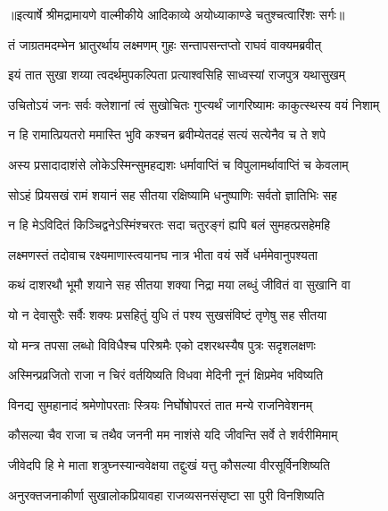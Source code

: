 {॥इत्यार्षे श्रीमद्रामायणे वाल्मीकीये आदिकाव्ये अयोध्याकाण्डे चतुश्चत्वारिंशः सर्गः॥}


\twolineshloka
{तं जाग्रतमदम्भेन भ्रातुरर्थाय लक्ष्मणम्}
{गुहः सन्तापसन्तप्तो राघवं वाक्यमब्रवीत्} %

\twolineshloka
{इयं तात सुखा शय्या त्वदर्थमुपकल्पिता}
{प्रत्याश्वसिहि साध्वस्यां राजपुत्र यथासुखम्} %

\twolineshloka
{उचितोऽयं जनः सर्वः क्लेशानां त्वं सुखोचितः}
{गुप्त्यर्थं जागरिष्यामः काकुत्स्थस्य वयं निशाम्} %

\twolineshloka
{न हि रामात्प्रियतरो ममास्ति भुवि कश्चन}
{ब्रवीम्येतदहं सत्यं सत्येनैव च ते शपे} %

\twolineshloka
{अस्य प्रसादादाशंसे लोकेऽस्मिन्सुमहद्यशः}
{धर्मावाप्तिं च विपुलामर्थावाप्तिं च केवलाम्} %

\twolineshloka
{सोऽहं प्रियसखं रामं शयानं सह सीतया}
{रक्षिष्यामि धनुष्पाणिः सर्वतो ज्ञातिभिः सह} %

\twolineshloka
{न हि मेऽविदितं किञ्चिद्वनेऽस्मिंश्चरतः सदा}
{चतुरङ्गं ह्यपि बलं सुमहत्प्रसहेमहि} %

\twolineshloka
{लक्ष्मणस्तं तदोवाच रक्ष्यमाणास्त्वयानघ}
{नात्र भीता वयं सर्वे धर्ममेवानुपश्यता} %

\twolineshloka
{कथं दाशरथौ भूमौ शयाने सह सीतया}
{शक्या निद्रा मया लब्धुं जीवितं वा सुखानि वा} %

\twolineshloka
{यो न देवासुरैः सर्वैः शक्यः प्रसहितुं युधि}
{तं पश्य सुखसंविष्टं तृणेषु सह सीतया} %

\twolineshloka
{यो मन्त्र तपसा लब्धो विविधैश्च परिश्रमैः}
{एको दशरथस्यैष पुत्रः सदृशलक्षणः} %

\twolineshloka
{अस्मिन्प्रव्रजितो राजा न चिरं वर्तयिष्यति}
{विधवा मेदिनी नूनं क्षिप्रमेव भविष्यति} %

\twolineshloka
{विनद्य सुमहानादं श्रमेणोपरताः स्त्रियः}
{निर्घोषोपरतं तात मन्ये राजनिवेशनम्} %

\twolineshloka
{कौसल्या चैव राजा च तथैव जननी मम}
{नाशंसे यदि जीवन्ति सर्वे ते शर्वरीमिमाम्} %

\twolineshloka
{जीवेदपि हि मे माता शत्रुघ्नस्यान्ववेक्षया}
{तद्दुःखं यत्तु कौसल्या वीरसूर्विनशिष्यति} %

\twolineshloka
{अनुरक्तजनाकीर्णा सुखालोकप्रियावहा}
{राजव्यसनसंसृष्टा सा पुरी विनशिष्यति} %

